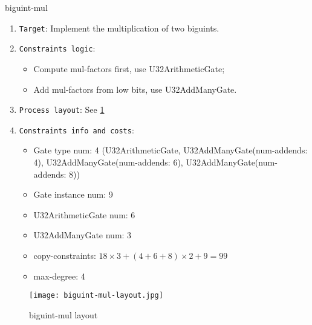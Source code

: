 {biguint-mul}

\begin{enumerate}
    \item \verb|Target|: Implement the multiplication of two biguints.
    \item \verb|Constraints logic|:
    \begin{itemize}
        \item Compute mul-factors first, use U32ArithmeticGate;
        \item Add mul-factors from low bits, use U32AddManyGate.
    \end{itemize}
    \item \verb|Process layout|: See \ref{fig:biguint-mul-layout}
    \item \verb|Constraints info and costs|:
    \begin{itemize}
        \item Gate type num: 4 (U32ArithmeticGate, U32AddManyGate(num-addends: 4), U32AddManyGate(num-addends: 6), U32AddManyGate(num-addends: 8))
        \item Gate instance num: 9
        \item U32ArithmeticGate num: 6
        \item U32AddManyGate num: 3
        \item copy-constraints: $18 \times 3 + (4 + 6 + 8) \times 2 + 9 = 99$
        \item max-degree: 4
    \end{itemize}
\end{enumerate}

\begin{figure}[!ht]
    \centering
    \texttt{[image: biguint-mul-layout.jpg]}
    \caption{biguint-mul layout}
    \label{fig:biguint-mul-layout}
\end{figure}